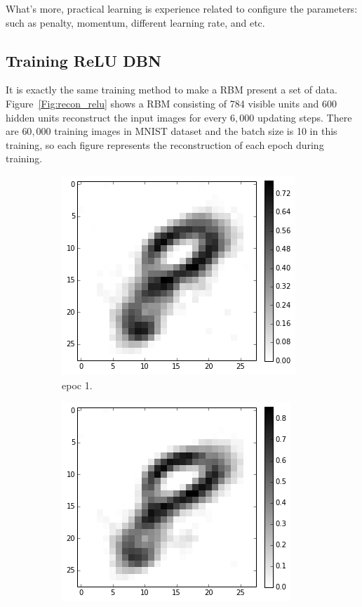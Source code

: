		What's more, practical learning is experience related to configure the parameters: such as penalty, momentum, different learning rate, and etc.
\subsection{Training ReLU DBN}
	It is exactly the same training method to make a RBM present a set of data.
	Figure~\ref{Fig:recon_relu} shows a RBM consisting of 784 visible units and 600 hidden units reconstruct the input images for every $6,000$ updating steps.
	There are $60,000$ training images in MNIST dataset and the batch size is 10 in this training, so each figure represents the reconstruction of each epoch during training.
	
	\begin{figure}[hbt]
		\centering
		\begin{subfigure}[t]{0.18\textwidth}
			\includegraphics[width=\textwidth]{pics_sdbn/b10_epoc1.png}
			\caption{epoc 1.}
		\end{subfigure}
		\begin{subfigure}[t]{0.18\textwidth}
			\includegraphics[width=\textwidth]{pics_sdbn/b10_epoc2.png}

\end{subfigure}
\end{figure}
